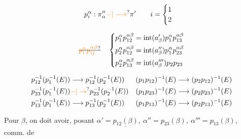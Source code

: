 \[
p_i^\alpha:\pi''_\alpha\unsure{-|\longrightarrow}\pi'\qquad
i=\begin{cases}1\\2\end{cases}
\]

\[
\deleted{\unsure{p_i^\alpha p_{ij}^{\alpha\beta}}}\quad
\left\{\begin{aligned}
 p_1^\alpha p_{12}^{\alpha\beta}&=\operatorname{int}(a'_\beta)p_1^\alpha p_{13}^{\alpha\beta}\\
 p_2^\alpha p_{12}^{\alpha\beta}&=\operatorname{int}(a''_\beta)p_1^\alpha p_{23}^{\alpha\beta}\\
 p_2^\alpha p_{13}^{\alpha\beta}&=\operatorname{int}(a'''_\beta)p_2 p_{23}
\end{aligned}\right.
\]

\[
\begin{aligned}
p_{12}^{-1}(p_1^{-1}(E))&\longrightarrow p_{12}^{-1}(p_2^{-1}(E))&
(p_1p_{12})^{-1}(E)&\longrightarrow(p_2p_{12})^{-1}(E)\\
p_{23}^{-1}(p_1^{-1}(E))&\unsure{-|\to}p_{23}^{-1}(p_2^{-1}(E))&
(p_1p_{23})^{-1}(E)&\longrightarrow(p_2p_{23})^{-1}(E)\\
p_{13}^{-1}(p_1^{-1}(E))&\longrightarrow p_{13}^{-1}(p_2^{-1}(E))&
(p_1p_{13})^{-1}(E)&\longrightarrow(p_2p_{13})^{-1}(E)
\end{aligned}
\]


Pour  $\beta$, on doit avoir, posant $\alpha'=\underline{p_{12}(\beta)},\ \alpha''=p_{23}(\beta),\ \alpha'''=p_{13}(\beta)$, comm. de


